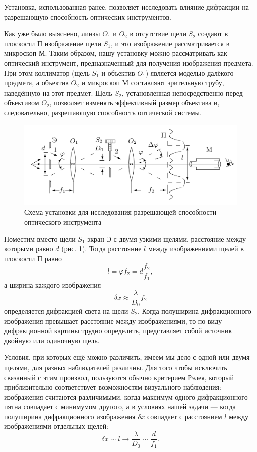 \documentclass[12pt, a4paper]{article}
\begin{document}
Установка, использованная ранее, позволяет исследовать влияние дифракции на разрешающую способность оптических инструментов.

Как уже было выяснено, линзы $O_1$ и $ O_2$ в отсутствие щели $S_2$ создают в плоскости П изображение щели $S_1$, и это изображение рассматривается в микроскоп М. Таким образом, нашу установку можно рассматривать как оптический инструмент, предназначенный для получения изображения предмета. При этом коллиматор (щель $S_1$ и объектив $O_1$) является моделью далёкого предмета, а объектив $O_2$ и микроскоп М составляют зрительную трубу, наведённую на этот предмет.
Щель $S_2$, установленная непосредственно перед объективом $O_2$, позволяет изменять эффективный размер объектива и, следовательно, разрешающую способность оптической системы.

\begin{figure}[H]
  \centering
  \includegraphics[scale=0.15]{pics/setup_d.jpeg}
  \caption{Схема установки для исследования разрешающей
    способности оптического инструмента}
  \label{pic:setup_d}
\end{figure}

Поместим вместо щели $S_1$ экран Э с двумя узкими щелями, расстояние между которыми равно $d$ (рис. \ref{pic:setup_d}). Тогда расстояние $l$ между изображениями щелей в плоскости П равно
\begin{equation}
  l = \varphi f_2 = d \dfrac{f_2}{f_1},
\end{equation}
а ширина каждого изображения
\begin{equation}
  \delta x \approx \dfrac{\lambda}{D_0} f_2
\end{equation}
определяется дифракцией света на щели $S_2$. Когда полуширина дифракционного изображения превышает расстояние между изображениями, то по виду дифракционной картины трудно определить, представляет собой источник двойную или одиночную щель.

Условия, при которых ещё можно различить, имеем мы дело с одной или двумя щелями, для разных наблюдателей различны. Для того чтобы исключить связанный с этим произвол, пользуются обычно критерием Рэлея, который приблизительно соответствует возможностям визуального наблюдения: изображения считаются различимыми, когда максимум одного дифракционного пятна совпадает с минимумом другого, а в условиях нашей задачи --- когда полуширина дифракционного изображения $\delta x$ совпадает с расстоянием $l$ между изображениями отдельных щелей:
\begin{equation}
  \delta x \sim l \to \dfrac{\lambda}{D_0} \sim \dfrac{d}{f_1}.
  \label{eq:resolution}
\end{equation}
\end{document}
